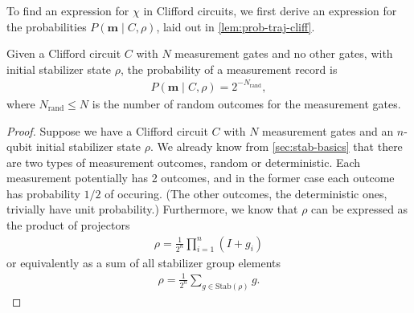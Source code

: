 To find an expression for $\chi$ in Clifford circuits, we first derive an
expression for the probabilities $P\left( \mathbf{m} \mid C, \rho \right)$,
laid out in \cref{lem:prob-traj-cliff}.
\begin{lem}\label{lem:prob-traj-cliff}
  Given a Clifford circuit $C$ with $N$ measurement gates and no other gates, with initial
  stabilizer state $\rho$, the probability of a measurement record is
  \begin{align}
    P\left(\mathbf{m} \mid C, \rho\right) = 2^{-N_\mathrm{rand}}
  ,\end{align}
  where $N_\mathrm{rand} \leq N$ is the number of random outcomes for the
  measurement gates.
\end{lem}
\begin{proof}
Suppose we have a Clifford circuit $C$ with $N$ measurement gates and an
$n$-qubit initial stabilizer state $\rho$. We already
know from \cref{sec:stab-basics} that there are two types of measurement
outcomes, random or deterministic. Each measurement potentially has 2 outcomes,
and in the former case each outcome has probability $1 / 2$ of occuring. (The
other outcomes, the deterministic ones, trivially have unit probability.)
Furthermore, we know that $\rho$ can be expressed as the product of projectors
\begin{align}
  \rho = \frac{1}{2^n} \prod_{i=1}^n (I + g_i)
\end{align}
or equivalently as a sum of all stabilizer group elements
\begin{align}
  \rho = \frac{1}{2^n} \sum_{g\in \mathrm{Stab}(\rho)} g
.\end{align}


\end{proof}
